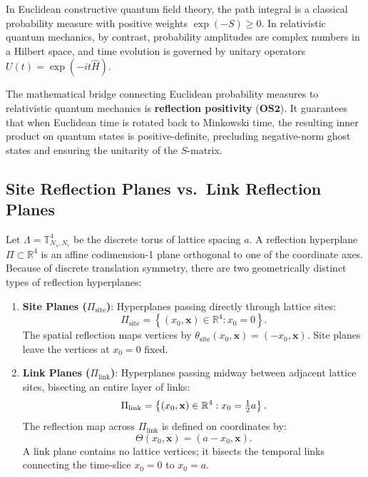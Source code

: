 In Euclidean constructive quantum field theory, the path integral is a classical probability measure with positive weights $\exp(-S) \ge 0$. In relativistic quantum mechanics, by contrast, probability amplitudes are complex numbers in a Hilbert space, and time evolution is governed by unitary operators $U(t) = \exp(-i t \hat{H})$. 

The mathematical bridge connecting Euclidean probability measures to relativistic quantum mechanics is \textbf{reflection positivity} ($\mathbf{OS2}$). It guarantees that when Euclidean time is rotated back to Minkowski time, the resulting inner product on quantum states is positive-definite, precluding negative-norm ghost states and ensuring the unitarity of the $S$-matrix.

\subsection{Site Reflection Planes vs.\ Link Reflection Planes}
\label{subsec:reflection_planes}
Let $\Lambda = \mathbb{T}_{N_s, N_\tau}^4$ be the discrete torus of lattice spacing $a$. A reflection hyperplane $\Pi \subset \mathbb{R}^4$ is an affine codimension-1 plane orthogonal to one of the coordinate axes. Because of discrete translation symmetry, there are two geometrically distinct types of reflection hyperplanes:
\begin{enumerate}
    \item \textbf{Site Planes ($\Pi_{\mathrm{site}}$)}: Hyperplanes passing directly through lattice sites:
    \begin{equation}
    \Pi_{\mathrm{site}} = \left\{ (x_0, \mathbf{x}) \in \mathbb{R}^4 : x_0 = 0 \right\}.
    \end{equation}
    The spatial reflection maps vertices by $\theta_{\mathrm{site}}(x_0, \mathbf{x}) = (-x_0, \mathbf{x})$. Site planes leave the vertices at $x_0 = 0$ fixed.
    \item \textbf{Link Planes ($\Pi_{\mathrm{link}}$)}: Hyperplanes passing midway between adjacent lattice sites, bisecting an entire layer of links:
    \begin{equation}
    \Pi_{\mathrm{link}} = \left\{ (x_0, \mathbf{x}) \in \mathbb{R}^4 : x_0 = \tfrac{1}{2} a \right\}.
    \end{equation}
    The reflection map across $\Pi_{\mathrm{link}}$ is defined on coordinates by:
    \begin{equation}
    \label{eq:theta_link_plane}
    \Theta(x_0, \mathbf{x}) = (a - x_0, \mathbf{x}).
    \end{equation}
    A link plane contains no lattice vertices; it bisects the temporal links connecting the time-slice $x_0 = 0$ to $x_0 = a$.
\end{enumerate}

